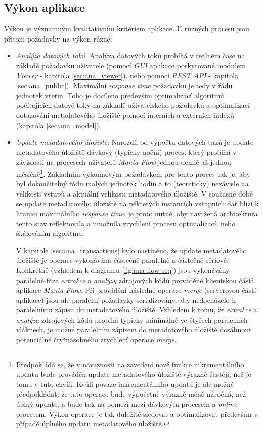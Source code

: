\subsection{Výkon aplikace}
\label{sec:ana_performance}
Výkon je významným kvalitativním kritériem aplikace. U různých procesů jsou přitom požadavky na výkon různé:
\begin{itemize}
	\item{\textit{Analýza datových toků}}: Analýza datových toků probíhá v reálném čase na základě požadavku uživatele (pomocí \textit{GUI} aplikace poskytované modulem \textit{Viewer} - kapitola \ref{sec:ana_viewer}), nebo pomocí \textit{REST API} - kapitola \ref{sec:ana_public}). Maximální \textit{response time} požadavku je tedy v řádu jednotek vteřin. Toho je docíleno především optimalizací algoritmů počítajících datové toky na základě uživatelského požadavku a optimalizací dotazování metadatového úložiště pomocí interních a externích indexů (kapitola \ref{sec:ana_model}).

	\item{\textit{Update metadatového úložiště}}: Narozdíl od výpočtu datových toků je update metadatového úložiště dávkový (typicky noční) proces, který probíhá v závislosti na procesech uživatelů \textit{Manta Flow} jednou denně až jednou měsíčně\footnote{Předpokládá se, že v návaznosti na zavedení nové funkce inkrementálního updatu \cite{Sykora17} bude prováděn update metadatového úložiště výrazně častěji, než je tomu v tuto chvíli. Kvůli povaze inkrementálního updatu je ale možné předpokládat, že tato operace bude výpočetně výrazně méně náročná, než úplný update, a bude tak na pomezí mezi dávkovým procesem a \textit{online} procesem. Výkon operace je tak důležité sledovat a optimalizovat především v případě úplného updatu metadatového úložiště.}. Základním výkonnovým požadavkem pro tento proces tak je, aby byl dokončitelný řádu malých jednotek hodin a to (teoreticky) nezávisle na velikosti vstupů a aktuální velikosti metadatového úložiště. V současné době se update metadatového úložiště na některých instancích vstupních dat blíží k hranici maximálního \textit{response time}, je proto nutné, aby navržená architektura tento stav reflektovala a umožnila zrychlení procesu optimalizací, nebo škálováním algoritmu.

	V kapitole \ref{sec:ana_transactions} bylo nastíněno, že update metadatového úložiště je operace vykonávána částečně paralelně a částečně sériově. Konkrétně (vzhledem k diagramu \ref{fig:ana-flow-seq}) jsou vykonávány paralelně fáze \textit{extrakce} a \textit{analýzy} zdrojových kódů prováděné klientskou částí aplikace \textit{Manta Flow}. Při provádění následné operace \textit{merge} (serverovou částí aplikace) jsou ale paralelní požadavky serializovány, aby nedocházelo k paralelnímu zápisu do metadatového úložiště. Vzhledem k tomu, že \textit{extrakce} a \textit{analýza} zdrojových kódů probíhá typicky minimálně ve čtyřech paralelních vláknech, je možné paralelním zápisem do metadatového úložiště dosáhnout potenciálně čtyřnásobného zrychlení operace \textit{merge}.


\end{itemize}
